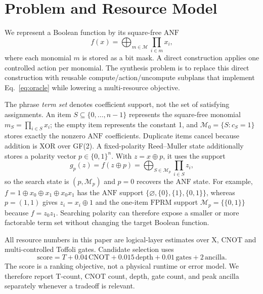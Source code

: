 \documentclass[11pt]{article}
\newcommand{\anf}{\ensuremath{\mathrm{ANF}}}
\newcommand{\fprm}{\ensuremath{\mathrm{FPRM}}}
\newcommand{\xor}{\ensuremath{\oplus}}
\newcommand{\score}{\ensuremath{\mathrm{score}}}
\begin{document}
\section{Problem and Resource Model}

We represent a Boolean function by its square-free \anf{}
\begin{equation}
  f(x)=\bigoplus_{m\in\mathcal{M}}\prod_{i\in m}x_i ,
  \label{eq:anf}
\end{equation}
where each monomial $m$ is stored as a bit mask.  A direct construction applies
one controlled action per monomial.  The synthesis problem is to replace this
direct construction with reusable compute/action/uncompute subplans that
implement Eq.~\eqref{eq:oracle} while lowering a multi-resource objective.

The phrase \emph{term set} denotes coefficient support, not the set of
satisfying assignments.  An item $S\subseteq\{0,\ldots,n-1\}$ represents the
square-free monomial $m_S=\prod_{i\in S}x_i$; the empty item represents the
constant 1, and
$\mathcal{M}_0=\{S:c_S=1\}$ stores exactly the nonzero \anf{} coefficients.
Duplicate items cancel because addition is XOR over GF(2).  A fixed-polarity
Reed--Muller state additionally stores a polarity vector
$p\in\{0,1\}^n$.  With $z=x\xor p$, it uses the support
\begin{equation}
g_p(z)=f(z\xor p)=\bigoplus_{S\in\mathcal{M}_p}\prod_{i\in S}z_i,
\label{eq:fprm-support}
\end{equation}
so the search state is $(p,\mathcal{M}_p)$ and $p=0$ recovers the \anf{} state.
For example,
$f=1\xor x_0\xor x_1\xor x_0x_1$ has the \anf{} support
$\{\varnothing,\{0\},\{1\},\{0,1\}\}$, whereas $p=(1,1)$ gives
$z_i=x_i\xor1$ and the one-item \fprm{} support
$\mathcal{M}_p=\{\{0,1\}\}$ because $f=z_0z_1$.  Searching polarity can
therefore expose a smaller or more factorable term set without changing the
target Boolean function.

All resource numbers in this paper are logical-layer estimates over X, CNOT
and multi-controlled Toffoli gates.  Candidate selection uses
\begin{equation}
  \score =
  T + 0.04\,\mathrm{CNOT} + 0.015\,\mathrm{depth}
  + 0.01\,\mathrm{gates} + 2\,\mathrm{ancilla}.
  \label{eq:score}
\end{equation}
The score is a ranking objective, not a physical runtime or error model.  We
therefore report T-count, CNOT count, depth, gate count, and peak ancilla
separately whenever a tradeoff is relevant.
\end{document}
